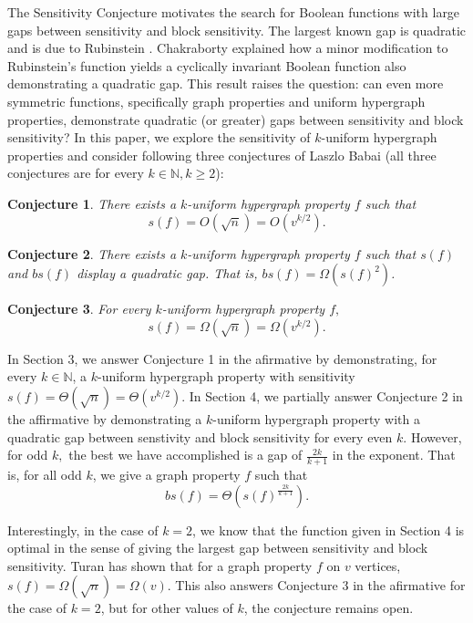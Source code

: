 \documentclass[psamsfonts]{amsart}
\newtheorem{conj}{Conjecture}
\theoremstyle{definition}
\theoremstyle{remark}
\numberwithin{equation}{section}
\begin{document}
The Sensitivity Conjecture motivates the search for Boolean functions with large gaps between sensitivity and block sensitivity. The largest known gap is quadratic and is due to Rubinstein \cite{R}. Chakraborty \cite{C} explained how a minor modification to Rubinstein's function yields a cyclically invariant Boolean function also demonstrating a quadratic gap. This result raises the question: can even more symmetric functions, specifically graph properties and uniform hypergraph properties, demonstrate quadratic (or greater) gaps between sensitivity and block sensitivity? In this paper, we explore the sensitivity of $k$-uniform hypergraph properties and consider following three conjectures of Laszlo Babai (all three conjectures are for every $k \in \mathbb{N}, k\geq 2$):

\begin{conj}
There exists a $k$-uniform hypergraph property $f$ such that $$s(f)=O(\sqrt{n})=O(v^{k/2}).$$
\end{conj}

\begin{conj}
There exists a $k$-uniform hypergraph property $f$ such that $s(f)$ and $bs(f)$ display a quadratic gap. That is,  $bs(f)=\Omega(s(f)^2)$.
\end{conj}

\begin{conj}
For every $k$-uniform hypergraph property $f,$ $$s(f)=\Omega(\sqrt{n})=\Omega(v^{k/2}).$$
\end{conj}

In Section 3, we answer Conjecture 1 in the afirmative by demonstrating, for every $k \in \mathbb{N}$, a $k$-uniform hypergraph property with sensitivity $s(f)=\Theta(\sqrt{n})=\Theta(v^{k/2})$. In Section 4, we partially answer Conjecture 2 in the affirmative by demonstrating a $k$-uniform hypergraph property with a quadratic gap between senstivity and block sensitivity for every even $k$.  However, for odd $k,$ the best we have accomplished is a gap of $\frac{2k}{k+1}$ in the exponent.  That is, for all odd $k$, we give a graph property $f$ such that 
$$bs(f)=\Theta(s(f)^{\frac{2k}{k+1}}).$$

Interestingly, in the case of $k=2$, we know that the function given in Section 4 is optimal in the sense of giving the largest gap between sensitivity and block sensitivity.  Turan \cite{T} has shown that for a graph property $f$ on $v$ vertices, $s(f) = \Omega(\sqrt{n})=\Omega(v)$. This also answers Conjecture 3 in the afirmative for the case of $k=2$, but for other values of $k$, the conjecture remains open. 
\end{document}
